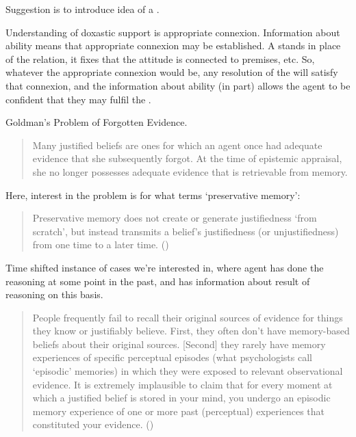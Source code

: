 \newpage

\begin{note}[\future{}]
  Suggestion is to introduce idea of a \future{}.

  Understanding of doxastic support is appropriate connexion.
  Information about ability means that appropriate connexion may be established.
  A \future{} stands in place of the relation, it fixes that the attitude is connected to premises, etc.
  So, whatever the appropriate connexion would be, any resolution of the \future{} will satisfy that connexion, and the information about ability (in part) allows the agent to be confident that they may fulfil the \future{}.
\end{note}

\newpage


\begin{note}
  Goldman's Problem of Forgotten Evidence.

  \begin{quote}
    Many justified beliefs are ones for which an agent once had adequate evidence that she subsequently forgot. At the time of epistemic appraisal, she no longer possesses adequate evidence that is retrievable from memory.
  \end{quote}

  Here, interest in the problem is for what \citeauthor{Goldman:2011vn} terms `preservative memory':
  \begin{quote}
    Preservative memory does not create or generate justifiedness `from scratch', but instead transmits a belief's justifiedness (or unjustifiedness) from one time to a later time.\nolinebreak
    \mbox{}\hfill\mbox{(\citeyear[259--260]{Goldman:2011vn})}
  \end{quote}
  Time shifted instance of cases we're interested in, where agent has done the reasoning at some point in the past, and has information about result of reasoning on this basis.

  \begin{quote}
    People frequently fail to recall their original sources of evidence for things they know or justiﬁably believe.
    First, they often don’t have memory-based beliefs about their original sources.
    [Second] they rarely have memory experiences of speciﬁc perceptual episodes (what psychologists call `episodic' memories) in which they were exposed to relevant observational evidence.
    It is extremely implausible to claim that for every moment at which a justiﬁed belief is stored in your mind, you undergo an episodic memory experience of one or more past (perceptual) experiences that constituted your evidence.\nolinebreak
    \mbox{}\hfill\mbox{(\citeyear[266--267]{Goldman:2011vn})}
  \end{quote}


\end{note}
